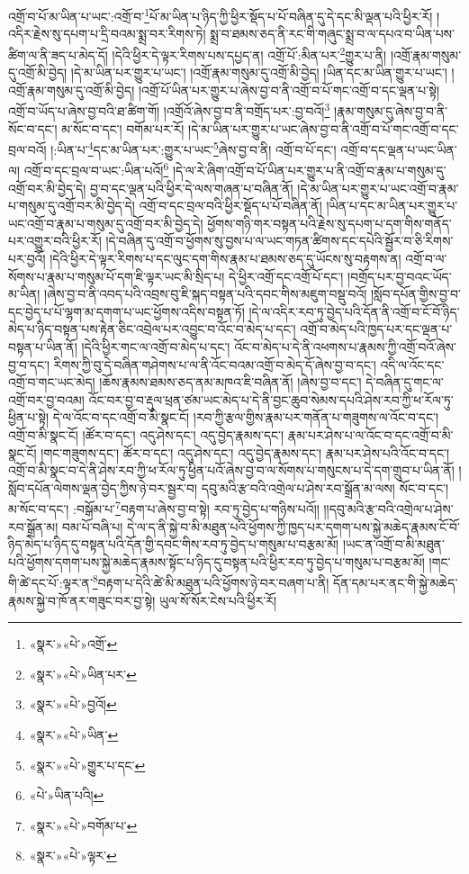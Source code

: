 འགྲོ་བ་པོ་མ་ཡིན་པ་ཡང་:འགྲོ་བ་\footnote{«སྣར་»«པེ་»འགྲོ་}པོ་མ་ཡིན་པ་ཉིད་ཀྱི་ཕྱིར་སྡོད་པ་པོ་བཞིན་དུ་དེ་དང་མི་ལྡན་པའི་ཕྱིར་རོ། །འདིར་རྗེས་སུ་དཔག་པ་དྲི་བའམ་སྨྲ་བར་རིགས་ཏེ། སྨྲ་བ་ཐམས་ཅད་ནི་རང་གི་གཞུང་སྨྲ་བ་ལ་དཔའ་བ་ཡིན་པས་ཚིག་ལ་ནི་ཟད་པ་མེད་དོ། །དེའི་ཕྱིར་དེ་ལྟར་རིགས་པས་དཔྱད་ན། འགྲོ་པོ་:མིན་པར་\footnote{«སྣར་»«པེ་»ཡིན་པར་}གྱུར་པ་ནི། །འགྲོ་རྣམ་གསུམ་དུ་འགྲོ་མི་བྱེད། །དེ་མ་ཡིན་པར་གྱུར་པ་ཡང་། །འགྲོ་རྣམ་གསུམ་དུ་འགྲོ་མི་བྱེད། །ཡིན་དང་མ་ཡིན་གྱུར་པ་ཡང་། །འགྲོ་རྣམ་གསུམ་དུ་འགྲོ་མི་བྱེད། །འགྲོ་པོ་ཡིན་པར་གྱུར་པ་ཞེས་བྱ་བ་ནི་འགྲོ་བ་པོ་གང་འགྲོ་བ་དང་ལྡན་པ་སྟེ། འགྲོ་བ་ཡོད་པ་ཞེས་བྱ་བའི་ཐ་ཚིག་གོ། །འགྲོའོ་ཞེས་བྱ་བ་ནི་བགྲོད་པར་:བྱ་བའོ།\footnote{«སྣར་»«པེ་»བྱའོ།} །རྣམ་གསུམ་དུ་ཞེས་བྱ་བ་ནི་སོང་བ་དང་། མ་སོང་བ་དང་། བགོམ་པར་རོ། །དེ་མ་ཡིན་པར་གྱུར་པ་ཡང་ཞེས་བྱ་བ་ནི་འགྲོ་བ་པོ་གང་འགྲོ་བ་དང་བྲལ་བའོ། །:ཡིན་པ་\footnote{«སྣར་»«པེ་»ཡིན་}དང་མ་ཡིན་པར་:གྱུར་པ་ཡང་\footnote{«སྣར་»«པེ་»གྱུར་པ་དང་}ཞེས་བྱ་བ་ནི། འགྲོ་བ་པོ་དང་། འགྲོ་བ་དང་ལྡན་པ་ཡང་ཡིན་ལ། འགྲོ་བ་དང་བྲལ་བ་ཡང་:ཡིན་པའོ།\footnote{«པེ་»ཡིན་པའི།} །དེ་ལ་རེ་ཞིག་འགྲོ་བ་པོ་ཡིན་པར་གྱུར་པ་ནི་འགྲོ་བ་རྣམ་པ་གསུམ་དུ་འགྲོ་བར་མི་བྱེད་དེ། བྱ་བ་དང་ལྡན་པའི་ཕྱིར་དེ་ལས་གཞན་པ་བཞིན་ནོ། །དེ་མ་ཡིན་པར་གྱུར་པ་ཡང་འགྲོ་བ་རྣམ་པ་གསུམ་དུ་འགྲོ་བར་མི་བྱེད་དེ། འགྲོ་བ་དང་བྲལ་བའི་ཕྱིར་སྡོད་པ་པོ་བཞིན་ནོ། །ཡིན་པ་དང་མ་ཡིན་པར་གྱུར་པ་ཡང་འགྲོ་བ་རྣམ་པ་གསུམ་དུ་འགྲོ་བར་མི་བྱེད་དེ། ཕྱོགས་གཉི་གར་བསྟན་པའི་རྗེས་སུ་དཔག་པ་དག་གིས་གནོད་པར་འགྱུར་བའི་ཕྱིར་རོ། །དེ་བཞིན་དུ་འགྲོ་བ་ཕྱོགས་སུ་བྱས་པ་ལ་ཡང་གཏན་ཚིགས་དང་དཔེའི་སྦྱོར་བ་ཅི་རིགས་པར་བྱའོ། །དེའི་ཕྱིར་དེ་ལྟར་རིགས་པ་དང་ལུང་དག་གིས་རྣམ་པ་ཐམས་ཅད་དུ་ཡོངས་སུ་བརྟགས་ན། འགྲོ་བ་ལ་སོགས་པ་རྣམ་པ་གསུམ་པོ་དག་ཇི་ལྟར་ཡང་མི་སྲིད་པ། དེ་ཕྱིར་འགྲོ་དང་འགྲོ་པོ་དང་། །བགྲོད་པར་བྱ་བའང་ཡོད་མ་ཡིན། །ཞེས་བྱ་བ་ནི་འབད་པའི་འབྲས་བུ་ཇི་སྐད་བསྟན་པའི་དབང་གིས་མཇུག་བསྡུ་བའོ། །སློབ་དཔོན་གྱིས་བྱ་བ་དང་བྱེད་པ་པོ་ལྷག་མ་དགག་པ་ཡང་ཕྱོགས་འདིས་བསྟན་ཏོ། །དེ་ལ་འདིར་རབ་ཏུ་བྱེད་པའི་དོན་ནི་འགྲོ་བ་ངོ་བོ་ཉིད་མེད་པ་ཉིད་བསྟན་པས་རྟེན་ཅིང་འབྲེལ་པར་འབྱུང་བ་འོང་བ་མེད་པ་དང་། འགྲོ་བ་མེད་པའི་ཁྱད་པར་དང་ལྡན་པ་བསྟན་པ་ཡིན་ནོ། །དེའི་ཕྱིར་གང་ལ་འགྲོ་བ་མེད་པ་དང་། འོང་བ་མེད་པ་དེ་ནི་འཕགས་པ་རྣམས་ཀྱི་འགྲོ་བའོ་ཞེས་བྱ་བ་དང་། རིགས་ཀྱི་བུ་དེ་བཞིན་གཤེགས་པ་ལ་ནི་འོང་བའམ་འགྲོ་བ་མེད་དོ་ཞེས་བྱ་བ་དང་། འདི་ལ་འོང་དང་འགྲོ་བ་གང་ཡང་མེད། །ཆོས་རྣམས་ཐམས་ཅད་ནམ་མཁའ་ཇི་བཞིན་ནོ། །ཞེས་བྱ་བ་དང་། དེ་བཞིན་དུ་གང་ལ་འགྲོ་བར་བྱ་བའམ། འོང་བར་བྱ་བ་རྡུལ་ཕྲན་ཙམ་ཡང་མེད་པ་དེ་ནི་བྱང་ཆུབ་སེམས་དཔའི་ཤེས་རབ་ཀྱི་ཕ་རོལ་ཏུ་ཕྱིན་པ་སྟེ། དེ་ལ་འོང་བ་དང་འགྲོ་བ་མི་སྣང་ངོ། །རབ་ཀྱི་རྩལ་གྱིས་རྣམ་པར་གནོན་པ་གཟུགས་ལ་འོང་བ་དང་། འགྲོ་བ་མི་སྣང་ངོ། །ཚོར་བ་དང་། འདུ་ཤེས་དང་། འདུ་བྱེད་རྣམས་དང་། རྣམ་པར་ཤེས་པ་ལ་འོང་བ་དང་འགྲོ་བ་མི་སྣང་ངོ། །གང་གཟུགས་དང་། ཚོར་བ་དང་། འདུ་ཤེས་དང་། འདུ་བྱེད་རྣམས་དང་། རྣམ་པར་ཤེས་པའི་འོང་བ་དང་། འགྲོ་བ་མི་སྣང་བ་དེ་ནི་ཤེས་རབ་ཀྱི་ཕ་རོལ་ཏུ་ཕྱིན་པའོ་ཞེས་བྱ་བ་ལ་སོགས་པ་གསུངས་པ་དེ་དག་གྲུབ་པ་ཡིན་ནོ། །སློབ་དཔོན་ལེགས་ལྡན་བྱེད་ཀྱིས་ཉེ་བར་སྦྱར་བ། དབུ་མའི་རྩ་བའི་འགྲེལ་པ་ཤེས་རབ་སྒྲོན་མ་ལས། སོང་བ་དང་། མ་སོང་བ་དང་། :བསྒོམ་པ་\footnote{«སྣར་»«པེ་»བགོམ་པ་}བརྟག་པ་ཞེས་བྱ་བ་སྟེ། རབ་ཏུ་བྱེད་པ་གཉིས་པའོ།། །།དབུ་མའི་རྩ་བའི་འགྲེལ་པ་ཤེས་རབ་སྒྲོན་མ། བམ་པོ་བཞི་པ། དེ་ལ་ད་ནི་སྐྱེ་བ་མི་མཐུན་པའི་ཕྱོགས་ཀྱི་ཁྱད་པར་དགག་པས་སྐྱེ་མཆེད་རྣམས་ངོ་བོ་ཉིད་མེད་པ་ཉིད་དུ་བསྟན་པའི་དོན་གྱི་དབང་གིས་རབ་ཏུ་བྱེད་པ་གསུམ་པ་བརྩམ་མོ། །ཡང་ན་འགྲོ་བ་མི་མཐུན་པའི་ཕྱོགས་དགག་པས་སྐྱེ་མཆེད་རྣམས་སྟོང་པ་ཉིད་དུ་བསྟན་པའི་ཕྱིར་རབ་ཏུ་བྱེད་པ་གསུམ་པ་བརྩམ་མོ། །གང་གི་ཚེ་དང་པོ་:ལྟར་ན་\footnote{«སྣར་»«པེ་»ལྟར་}བརྟག་པ་དེའི་ཚེ་མི་མཐུན་པའི་ཕྱོགས་ཉེ་བར་བཞག་པ་ནི། དོན་དམ་པར་ནང་གི་སྐྱེ་མཆེད་རྣམས་སྐྱེ་བ་ཁོ་ནར་གཟུང་བར་བྱ་སྟེ། ཡུལ་སོ་སོར་ངེས་པའི་ཕྱིར་རོ། 